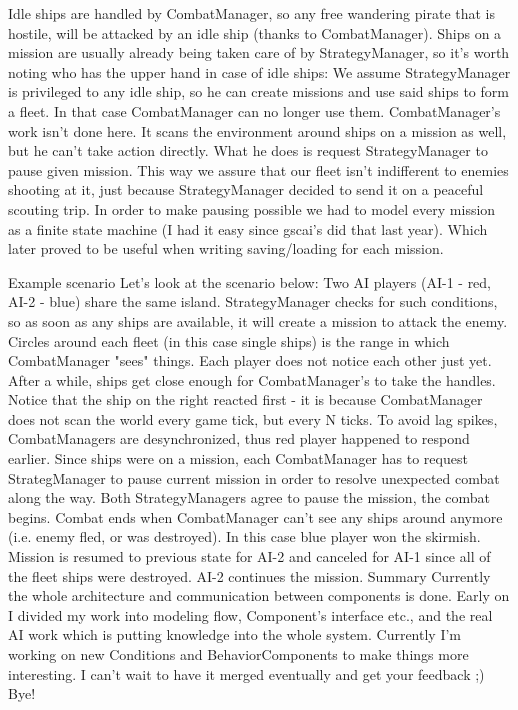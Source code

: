 Idle ships are handled by CombatManager, so any free wandering pirate that is hostile, will be attacked by an idle ship (thanks to CombatManager). 
Ships on a mission are usually already being taken care of by StrategyManager, so it's worth noting who has the upper hand in case of idle ships:
We assume StrategyManager is privileged to any idle ship, so he can create missions and use said ships to form a fleet. 
In that case CombatManager can no longer use them.
CombatManager's work isn't done here. It scans the environment around ships on a mission as well, but he can't take action directly. 
What he does is request StrategyManager to pause given mission. 
This way we assure that our fleet isn't indifferent to enemies shooting at it, just because StrategyManager decided to send it on a peaceful scouting trip. 
In order to make pausing possible we had to model every mission as a finite state machine (I had it easy since gscai's did that last year). 
Which later proved to be useful when writing saving/loading for each mission.

Example scenario
Let's look at the scenario below:
Two AI players (AI-1 - red, AI-2 - blue) share the same island. 
StrategyManager checks for such conditions, so as soon as any ships are available, it will create a mission to attack the enemy.
Circles around each fleet (in this case single ships) is the range in which CombatManager "sees" things. 
Each player does not notice each other just yet.
After a while, ships get close enough for CombatManager's to take the handles. 
Notice that the ship on the right reacted first - it is because CombatManager does not scan the world every game tick, but every N ticks. 
To avoid lag spikes, CombatManagers are desynchronized, thus red player happened to respond earlier.
Since ships were on a mission, each CombatManager has to request StrategManager to pause current mission in order to resolve unexpected combat along the way.
Both StrategyManagers agree to pause the mission, the combat begins.
Combat ends when CombatManager can't see any ships around anymore (i.e. enemy fled, or was destroyed). 
In this case blue player won the skirmish. 
Mission is resumed to previous state for AI-2 and canceled for AI-1 since all of the fleet ships were destroyed. 
AI-2 continues the mission.
Summary
Currently the whole architecture and communication between components is done. 
Early on I divided my work into modeling flow, Component's interface etc., and the real AI work which is putting knowledge into the whole system.
Currently I'm working on new Conditions and BehaviorComponents to make things more interesting.
I can't wait to have it merged eventually and get your feedback ;)
Bye!
